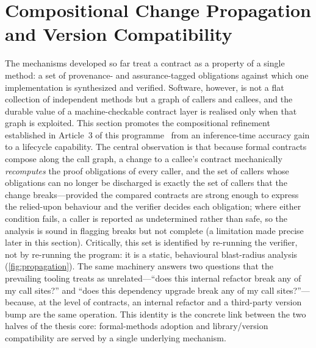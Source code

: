 \section{Compositional Change Propagation and Version Compatibility}\label{sec:propagation}

The mechanisms developed so far treat a contract as a property of a single
method: a set of provenance- and assurance-tagged obligations against which one
implementation is synthesized and verified. Software, however, is not a flat
collection of independent methods but a graph of callers and callees, and the
durable value of a machine-checkable contract layer is realised only when that
graph is exploited. This section promotes the compositional refinement
established in Article~3 of this programme~\cite{edmonds_article3} from an
inference-time accuracy gain to a lifecycle capability. The central observation
is that because formal contracts compose along the call graph, a change to a
callee's contract mechanically \emph{recomputes} the proof obligations of every
caller, and the set of callers whose obligations can no longer be discharged is
exactly the set of callers that the change breaks---provided the compared
contracts are strong enough to express the relied-upon behaviour and the verifier
decides each obligation; where either condition fails, a caller is reported as
undetermined rather than safe, so the analysis is sound in flagging breaks but not
complete (a limitation made precise later in this section). Critically, this set is
identified by re-running the verifier, not by re-running the program: it is a
static, behavioural blast-radius analysis (\cref{fig:propagation}). The same machinery answers two
questions that the prevailing tooling treats as unrelated---``does this internal
refactor break any of my call sites?'' and ``does this dependency upgrade break
any of my call sites?''---because, at the level of contracts, an internal
refactor and a third-party version bump are the same operation. This identity is
the concrete link between the two halves of the thesis core: formal-methods
adoption and library/version compatibility are served by a single underlying
mechanism.

